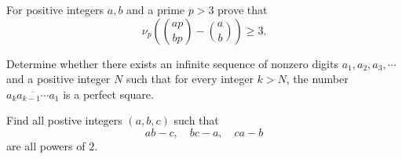 \documentclass[mast]{lucky}
\begin{document}
\begin{prob}{9}
For positive integers $a,b$ and a prime $p>3$ prove that \[\nu_p\left( \binom{ap}{bp}-\binom ab \right)\geq 3.\]
\end{prob}

\begin{prob}[ISL 2013 N4]{13}
Determine whether there exists an infinite sequence of nonzero digits $a_1 , a_2 , a_3 , \cdots $ and a positive integer $N$ such that for every integer $k > N$, the number $\overline{a_k a_{k-1}\cdots a_1 }$ is a perfect square.
\end{prob}

\begin{prob}[IMO 2015/2]{13}
Find all postive integers $(a,b,c)$ such that \[ab-c,\quad bc-a,\quad ca-b\] are all powers of $2$.
\end{prob}
\end{document}

